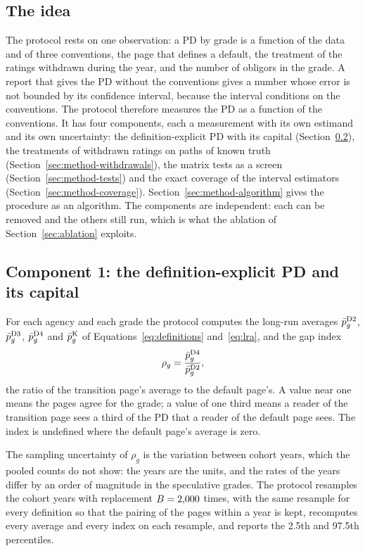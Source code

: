 \subsection{The idea}
\label{sec:method-idea}

The protocol rests on one observation: a PD by grade is a function of the data and of three conventions, the page that defines a default, the treatment of the ratings withdrawn during the year, and the number of obligors in the grade. A report that gives the PD without the conventions gives a number whose error is not bounded by its confidence interval, because the interval conditions on the conventions. The protocol therefore measures the PD as a function of the conventions. It has four components, each a measurement with its own estimand and its own uncertainty: the definition-explicit PD with its capital (Section~\ref{sec:method-definitions}), the treatments of withdrawn ratings on paths of known truth (Section~\ref{sec:method-withdrawals}), the matrix tests as a screen (Section~\ref{sec:method-tests}) and the exact coverage of the interval estimators (Section~\ref{sec:method-coverage}). Section~\ref{sec:method-algorithm} gives the procedure as an algorithm. The components are independent: each can be removed and the others still run, which is what the ablation of Section~\ref{sec:ablation} exploits. %

\subsection{Component 1: the definition-explicit PD and its capital}
\label{sec:method-definitions}

For each agency and each grade the protocol computes the long-run averages $\bar p^{\mathrm{D2}}_g$, $\bar p^{\mathrm{D3}}_g$, $\bar p^{\mathrm{D4}}_g$ and $\bar p^{\mathrm{K}}_g$ of Equations~\eqref{eq:definitions} and~\eqref{eq:lra}, and the gap index
\begin{equation}
\rho_g=\frac{\bar p^{\mathrm{D4}}_g}{\bar p^{\mathrm{D2}}_g},
\label{eq:gap-index}
\end{equation}
the ratio of the transition page's average to the default page's. A value near one means the pages agree for the grade; a value of one third means a reader of the transition page sees a third of the PD that a reader of the default page sees. The index is undefined where the default page's average is zero.

The sampling uncertainty of $\rho_g$ is the variation between cohort years, which the pooled counts do not show: the years are the units, and the rates of the years differ by an order of magnitude in the speculative grades. The protocol resamples the cohort years with replacement $B=2{,}000$ times, with the same resample for every definition so that the pairing of the pages within a year is kept, recomputes every average and every index on each resample, and reports the 2.5th and 97.5th percentiles.

